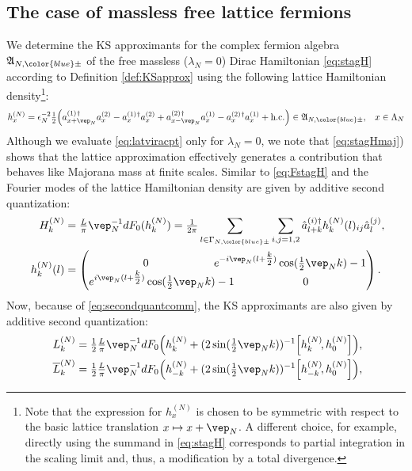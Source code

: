 \documentclass[a4paper, 11pt]{article}
\newcommand{\fA}{\mathfrak{A}}\newcommand{\cA}{\mathcal{A}}\newcommand{\dA}{\mathds{A}}\newcommand{\sA}{\mathscr{A}}
\DeclareMathOperator{\1}{\mathds{1}}
\begin{document}
\subsection{The case of massless free lattice fermions}
\label{sec:ffKS}
We determine the KS approximants for the complex fermion algebra $\fA_{N,{\color{blue}\pm}}$ of the free massless ($\lambda_{N}=0$) Dirac Hamiltonian \eqref{eq:stagH} according to Definition \ref{def:KSapprox} using the following lattice Hamiltonian density\footnote{Note that the expression for $h^{(N)}_{x}$ is chosen to be symmetric with respect to the basic lattice translation $x\mapsto x+\vep_{N}$. A different choice, for example, directly using the summand in \eqref{eq:stagH} corresponds to partial integration in the scaling limit and, thus, a modification by a total divergence.}:
\begin{align}
\label{eq:lathdfermisym}
h^{(N)}_{x} & = \epsilon_{N}^{-2}\tfrac{1}{2}\Big(a^{(1)\!\!\ \dagger}_{x+\vep_{N}}a^{(2)}_{x} - a^{(1)\!\!\ \dagger}_{x}a^{(2)}_{x} +a^{(2)\!\!\ \dagger}_{x-\vep_{N}}a^{(1)}_{x} - a^{(2)\!\!\ \dagger}_{x}a^{(1)}_{x} + \textup{h.c.}\Big)\in\fA_{N,{\color{blue}\pm}}, & x\in\Lambda_{N}
\end{align}
Although we evaluate \eqref{eq:latviracpt} only for $\lambda_{N}=0$, we note that \eqref{eq:stagHmaj}) shows that the lattice approximation effectively generates a contribution that behaves like Majorana mass at finite scales. Similar to  \eqref{eq:FstagH} and the Fourier modes of the lattice Hamiltonian density are given by additive second quantization:
\begin{align}
\label{eq:Flathdfermisym}
H^{(N)}_{k} & = \tfrac{L}{\pi}\vep_{N}^{-1}dF_{0}(h^{(N)}_{k}) = \tfrac{1}{2\pi}\sum_{l\in\Gamma_{N,{\color{blue}\pm}}}\sum_{i,j=1,2}\hat{a}^{(i)\dag}_{l+k}h^{(N)}_{k}(l)_{ij}\hat{a}^{(j)}_{l}, \\ \nonumber
h^{(N)}_{k}(l) & = \begin{pmatrix}\hspace{-1cm} 0 & \hspace{-1cm} e^{-i\vep_{N}(l+\tfrac{k}{2})}\cos(\tfrac{1}{2}\vep_{N}k)-1 \\ e^{i\vep_{N}(l+\tfrac{k}{2})}\cos(\tfrac{1}{2}\vep_{N}k)-1 & 0 \end{pmatrix}.
\end{align}
Now, because of \eqref{eq:secondquantcomm}, the KS approximants are also given by additive second quantization:
\begin{align}
\label{eq:latviraSQ}
L_{k}^{(N)} & = \tfrac{1}{2}\tfrac{L}{\pi}\vep_{N}^{-1}dF_{0}\Big(h_{k}^{(N)}+(2\sin(\tfrac{1}{2}\vep_{N}k))^{-1}\Big[h_{k}^{(N)}\!,h^{(N)}_{0}\Big]\Big), \\ \nonumber
\overline{L}_{k}^{(N)} & = \tfrac{1}{2}\tfrac{L}{\pi}\vep_{N}^{-1}dF_{0}\Big(h_{-k}^{(N)}+(2\sin(\tfrac{1}{2}\vep_{N}k))^{-1}\Big[h_{-k}^{(N)}\!,h^{(N)}_{0}\Big]\Big),
\end{align}
\end{document}
